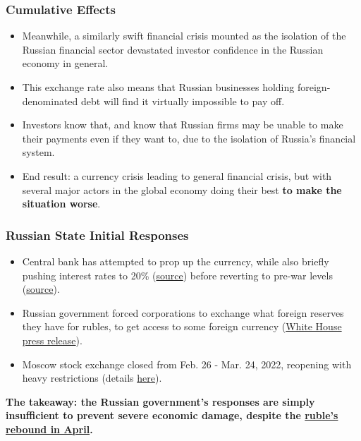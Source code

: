 \documentclass{beamer}
\begin{document}
\begin{frame} 
	\frametitle{\LARGE{Cumulative Effects}}
	\begin{itemize}
		\item Meanwhile, a similarly swift financial crisis mounted as the isolation of the Russian financial sector devastated investor confidence in the Russian economy in general. \pause
		\item This exchange rate also means that Russian businesses holding foreign-denominated debt will find it virtually impossible to pay off. \pause
		\item Investors know that, and know that Russian firms may be unable to make their payments even if they want to, due to the isolation of Russia's financial system. \pause
		\item End result: a currency crisis leading to general financial crisis, but with several major actors in the global economy doing their best \textbf{to make the situation worse}.
	\end{itemize}
\end{frame}

\begin{frame} 
	\frametitle{\LARGE{Russian State Initial Responses}}
	\begin{itemize}
		\item Central bank has attempted to prop up the currency, while also briefly pushing interest rates to 20\% (\href{https://www.npr.org/2022/02/28/1083478065/russias-central-bank-doubles-a-key-interest-rate-as-sanctions-spark-economic-tur}{source}) before reverting to pre-war levels (\href{https://www.cnbc.com/2022/06/10/russia-cuts-key-interest-rate-back-to-pre-war-level.html}{source}). \pause
		\item Russian government forced corporations to exchange what foreign reserves they have for rubles, to get access to some foreign currency (\href{https://www.whitehouse.gov/briefing-room/statements-releases/2022/03/24/fact-sheet-united-states-and-allies-and-partners-impose-additional-costs-on-russia/}{White House press release}). \pause
		\item Moscow stock exchange closed from Feb. 26 - Mar. 24, 2022, reopening with heavy restrictions (details \href{https://fortune.com/2022/03/24/russia-stock-market-reopen-moex-month-offline/}{here}). \pause
	\end{itemize}
	\textbf{The takeaway: the Russian government's responses are simply insufficient to prevent severe economic damage, despite the \href{https://www.nytimes.com/2022/04/04/opinion/ruble-value.html}{ruble's rebound in April}.}
\end{frame}
\end{document}
